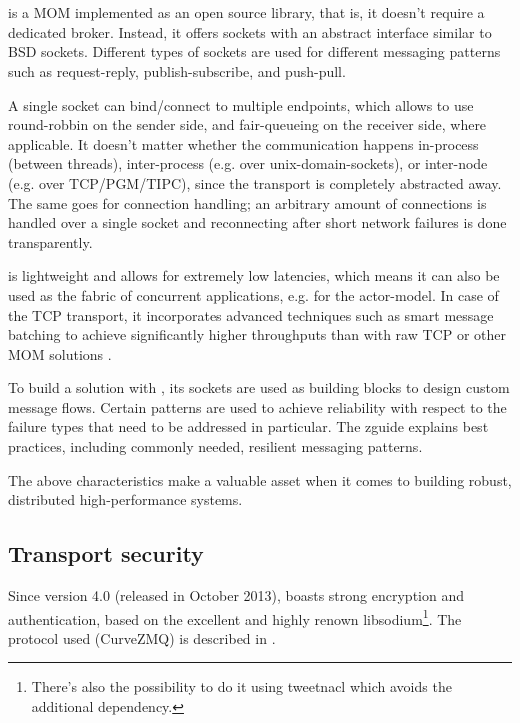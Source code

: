 \chapter{\zmq}\label{ch:zmq}
\zmq is a \gls{MOM} implemented as an open source library, that is, it doesn't
require a dedicated broker. Instead, it offers sockets with an abstract
interface similar to \acrshort{BSD} sockets. Different types of sockets are used for
different messaging patterns such as request-reply, publish-subscribe, and
push-pull.

A single socket can bind/connect to multiple endpoints, which allows \zmq to
use round-robbin on the sender side, and fair-queueing on the receiver side,
where applicable. It doesn't matter whether the communication happens
in-process (between threads), inter-process (e.g. over \glspl{unix-domain-socket}), or
inter-node (e.g. over \acrshort{TCP}/\acrshort{PGM}/\acrshort{TIPC}), since the transport is completely
abstracted away. The same goes for connection handling; an arbitrary amount of
connections is handled over a single socket and reconnecting after short
network failures is done transparently.

\zmq is lightweight and allows for extremely low latencies, which means it can
also be used as the fabric of concurrent applications, e.g. for the \gls{actor-model}.
In case of the TCP transport, it incorporates advanced techniques such
as smart message batching to achieve significantly higher throughputs than with
raw TCP or other \gls{MOM} solutions \cite[Figure 2, Middleware evaluation and
prototyping, p.~4]{cern:new-cmw}.

To build a solution with \zmq, its sockets are used as building blocks to
design custom message flows. Certain patterns are used to achieve reliability
with respect to the failure types that need to be addressed in particular.  The
\gls{zguide} explains best practices, including commonly needed, resilient
messaging patterns.

The above characteristics make \zmq a valuable asset when it comes to building
robust, distributed high-performance systems.

\section{Transport security}\label{sec:zmq:security}
Since version 4.0 (released in October 2013), \zmq boasts strong encryption and
authentication, based on the excellent and highly renown
\gls{libsodium}\footnote{There's also the possibility to do it using
\gls{tweetnacl} which avoids the additional dependency.}. The protocol used
(CurveZMQ) is described in \cite{zmq:curvezmq}.


